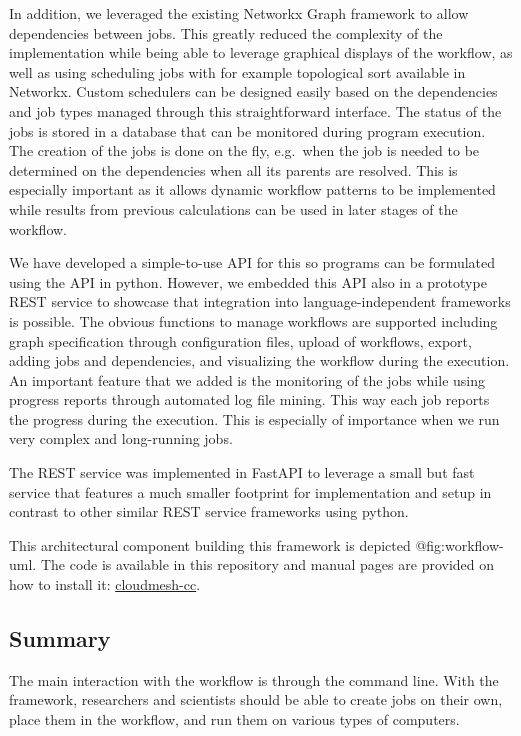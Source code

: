In addition, we leveraged the existing Networkx Graph framework to allow
dependencies between jobs. This greatly reduced the complexity of the
implementation while being able to leverage graphical displays of the
workflow, as well as using scheduling jobs with for example topological
sort available in Networkx. Custom schedulers can be designed easily
based on the dependencies and job types managed through this
straightforward interface. The status of the jobs is stored in a
database that can be monitored during program execution. The creation of
the jobs is done on the fly, e.g.~when the job is needed to be
determined on the dependencies when all its parents are resolved. This
is especially important as it allows dynamic workflow patterns to be
implemented while results from previous calculations can be used in
later stages of the workflow.

We have developed a simple-to-use API for this so programs can be
formulated using the API in python. However, we embedded this API also
in a prototype REST service to showcase that integration into
language-independent frameworks is possible. The obvious functions to
manage workflows are supported including graph specification through
configuration files, upload of workflows, export, adding jobs and
dependencies, and visualizing the workflow during the execution. An
important feature that we added is the monitoring of the jobs while
using progress reports through automated log file mining. This way each
job reports the progress during the execution. This is especially of
importance when we run very complex and long-running jobs.

The REST service was implemented in FastAPI to leverage a small but fast
service that features a much smaller footprint for implementation and
setup in contrast to other similar REST service frameworks using python.

This architectural component building this framework is depicted
@fig:workflow-uml. The code is available in this repository and manual
pages are provided on how to install it:
\href{https://github.com/cloudmesh/cloudmesh-cc}{cloudmesh-cc}.

\subsection{Summary}\label{summary}

The main interaction with the workflow is through the command line. With
the framework, researchers and scientists should be able to create jobs
on their own, place them in the workflow, and run them on various types
of computers.

